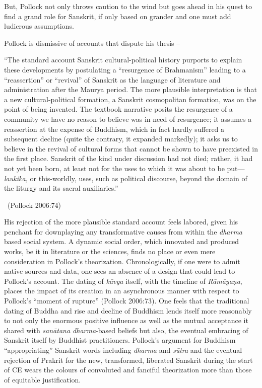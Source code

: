 But, Pollock not only throws caution to the wind but goes ahead in his quest to find a grand role for Sanskrit, if only based on grander and one must add ludicrous assumptions.

Pollock is dismissive of accounts that dispute his thesis –

\begin{myquote}
“The standard account Sanskrit cultural-political history purports to explain these developments by postulating a “resurgence of Brahmanism” leading to a “reassertion” or “revival” of Sanskrit as the language of literature and administration after the Maurya period. The more plausible interpretation is that a new cultural-political formation, a Sanskrit cosmopolitan formation, was on the point of being invented. The textbook narrative posits the resurgence of a community we have no reason to believe was in need of resurgence; it assumes a reassertion at the expense of Buddhism, which in fact hardly suffered a subsequent decline (quite the contrary, it expanded markedly); it asks us to believe in the revival of cultural forms that cannot be shown to have preexisted in the first place. Sanskrit of the kind under discussion had not died; rather, it had not yet been born, at least not for the uses to which it was about to be put—\textit{laukika,} or this-worldly, uses, such as political discourse, beyond the domain of the liturgy and its sacral auxiliaries.” 

~\hfill (Pollock 2006:74)
\end{myquote}

His rejection of the more plausible standard account feels labored, given his penchant for downplaying any transformative causes from within the \textit{dharma} based social system. A dynamic social order, which innovated and produced works, be it in literature or the sciences, finds no place or even mere consideration in Pollock’s theorization. Chronologically, if one were to admit native sources and data, one sees an absence of a design that could lead to Pollock’s account. The dating of \textit{kāvya} itself, with the timeline of \textit{Rāmāyaṇa}, places the impact of its creation in an asynchronous manner with respect to Pollock’s “moment of rupture” (Pollock 2006:73). One feels that the traditional dating of Buddha and rise and decline of Buddhism lends itself more reasonably to not only the enormous positive influence as well as the mutual acceptance it shared with \textit{sanātana dharma}-based beliefs but also, the eventual embracing of Sanskrit itself by Buddhist practitioners. Pollock’s argument for Buddhism “appropriating” Sanskrit words including \textit{dharma} and \textit{sūtra} and the eventual rejection of Prakrit for the new, transformed, liberated Sanskrit during the start of CE wears the colours of convoluted and fanciful theorization more than those of equitable justification.

